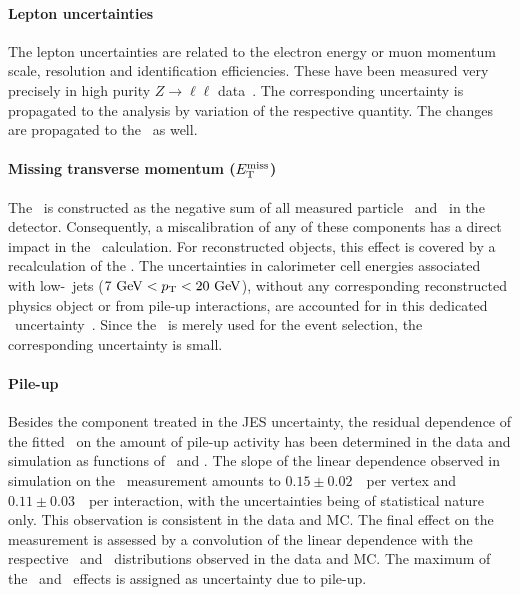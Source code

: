\paragraph{Lepton uncertainties}\mbox{}
%
The lepton uncertainties are related to the electron energy or muon momentum scale, resolution and identification efficiencies. 
%
These have been measured very precisely in high purity $Z\to \ell\ell$ data~\cite{CERN-PH-EP-2014-040,
CERN-PH-EP-2014-151}.
%
The corresponding uncertainty is propagated to the analysis by variation of the respective quantity. The changes are propagated to the \met\ as well. 
%
%
\paragraph{Missing transverse momentum (\boldmath$E_\mathrm{T}^\mathrm{miss}$)}\mbox{}
%
The \met\ is constructed as the negative sum of all measured particle \pt\ and \et\ in the detector.
%
Consequently, a miscalibration of any of these components has a direct impact in the \met\ calculation. 
%
For reconstructed objects, this effect is covered by a recalculation of the \met. 
%
The uncertainties in calorimeter cell energies associated with low-\pt\ jets ($7~\mathrm{GeV}< p_\mathrm{T} < 20~\mathrm{GeV}$), without any corresponding reconstructed physics object or from pile-up interactions, are accounted for in this dedicated \met\ uncertainty~\cite{ATLAS-MET-NEW}.
%
Since the \met\ is merely used for the event selection, the corresponding uncertainty is small.
%
%
\paragraph{Pile-up}\mbox{}
%
Besides the component treated in the \gls{JES} uncertainty, the residual dependence of the fitted \mt\ on the amount of pile-up activity has been determined in the data and simulation as functions of \nvtx\ and \meanmu. 
%
The slope of the linear dependence observed in simulation on the \mt\ measurement amounts to $0.15\pm0.02$~\GeV\ per vertex and $0.11\pm0.03$~\GeV\ per interaction, with the uncertainties being of statistical nature only. This observation is consistent in the data and \gls{MC}.
%
The final effect on the measurement is assessed by a convolution of the linear dependence with the respective \nvtx\ and \meanmu\ distributions observed in the data and \gls{MC}. 
%
The maximum of the \nvtx\ and \meanmu\ effects is assigned as uncertainty due to pile-up.









